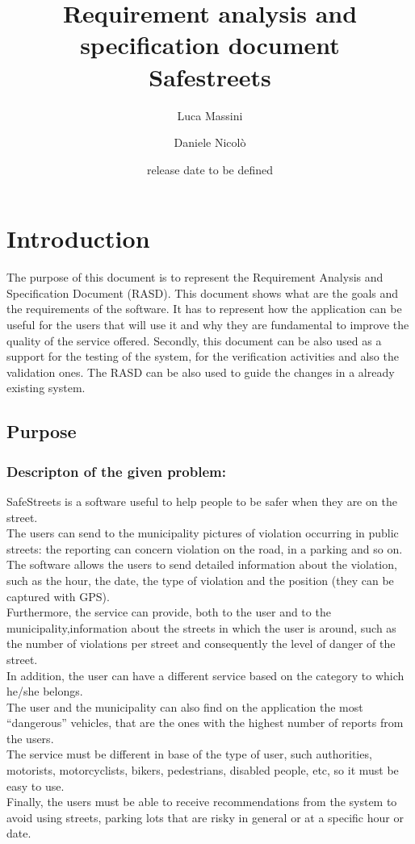 \documentclass[titlepage]{article}
\author{Luca Massini \and Daniele Nicolò}
\title{Requirement analysis and specification document
\\ Safestreets}
\date{release date to be defined}
\begin{document}
\maketitle

\section{Introduction}
The purpose of this document is to represent the Requirement Analysis and Specification Document (RASD).
This document shows what are the goals and the requirements of the software.
It has to represent how the application can be useful for the users that will use it and why they are fundamental to improve the quality of the service offered. Secondly, this document can be also used as a support for the testing of the system, for the verification activities and also the validation ones. The RASD can be also used to guide the changes in a already existing system.
\subsection{Purpose}

\subsubsection{Descripton of the given problem:}
SafeStreets is a software useful to help people to be safer when they are on the street.\\
The users can send to the municipality pictures of violation occurring in public streets: the reporting can concern violation on the road, in a parking and so on.\\
The software allows the users to send detailed information about the violation, such as the hour, the date, the type of violation and the position (they can be captured with GPS).\\
Furthermore, the service can provide, both to the user and to the municipality,information about the streets in which the user is around,
such as the number of violations per street and consequently the level of danger of the street.\\
In addition, the user can have a different service based on the category to which he/she belongs.\\
The user and the municipality can also find on the application the most “dangerous” vehicles, that are the ones with the highest number of reports from the users.\\
The service must be different in base of the type of user, such  authorities, motorists, motorcyclists, bikers, pedestrians, disabled people, etc, so it must be easy to use.\\
Finally, the users must be able to receive recommendations from the system to avoid using streets, parking lots that are risky in general or at a specific hour or date.\\
\end{document}
